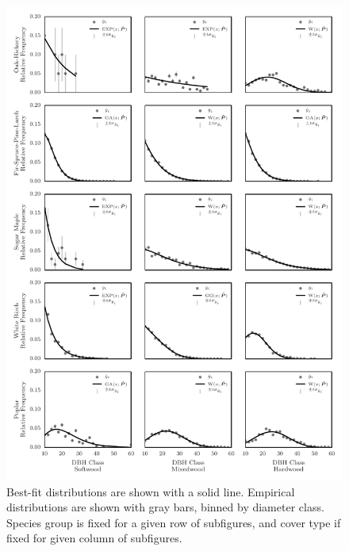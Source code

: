 \message{ !name(pspdistfit_article.tex)}\documentclass{article}
\begin{document}
\begin{figure}[h!]
  \centering
  \includegraphics[width=1.0\textwidth]{images/pspdistfit_fitplot0}
  \caption{Best-fit distributions are shown with a solid
    line. Empirical distributions are shown with gray bars, binned by
    diameter class. Species group is fixed for a given row of
    subfigures, and cover type if fixed for given column of subfigures.}
  \label{fig:results1}
\end{figure}
\end{document}
